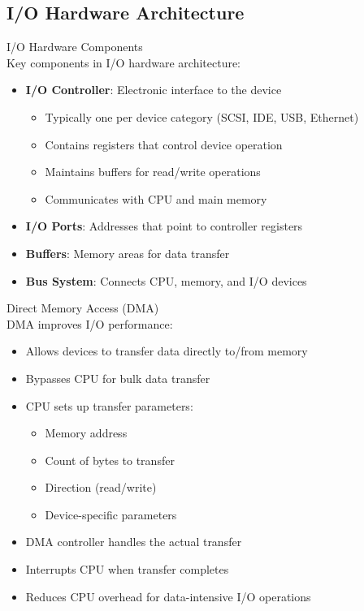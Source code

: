 \subsection{I/O Hardware Architecture}


\begin{definition}{I/O Hardware Components}\\
    Key components in I/O hardware architecture:
    \begin{itemize}
        \item \textbf{I/O Controller}: Electronic interface to the device
            \begin{itemize}
                \item Typically one per device category (SCSI, IDE, USB, Ethernet)
                \item Contains registers that control device operation
                \item Maintains buffers for read/write operations
                \item Communicates with CPU and main memory
            \end{itemize}
        \item \textbf{I/O Ports}: Addresses that point to controller registers
        \item \textbf{Buffers}: Memory areas for data transfer
        \item \textbf{Bus System}: Connects CPU, memory, and I/O devices
    \end{itemize}
\end{definition}

\begin{concept}{Direct Memory Access (DMA)}\\
    DMA improves I/O performance:
    \begin{itemize}
        \item Allows devices to transfer data directly to/from memory
        \item Bypasses CPU for bulk data transfer
        \item CPU sets up transfer parameters:
            \begin{itemize}
                \item Memory address
                \item Count of bytes to transfer
                \item Direction (read/write)
                \item Device-specific parameters
            \end{itemize}
        \item DMA controller handles the actual transfer
        \item Interrupts CPU when transfer completes
        \item Reduces CPU overhead for data-intensive I/O operations
    \end{itemize}
\end{concept}


